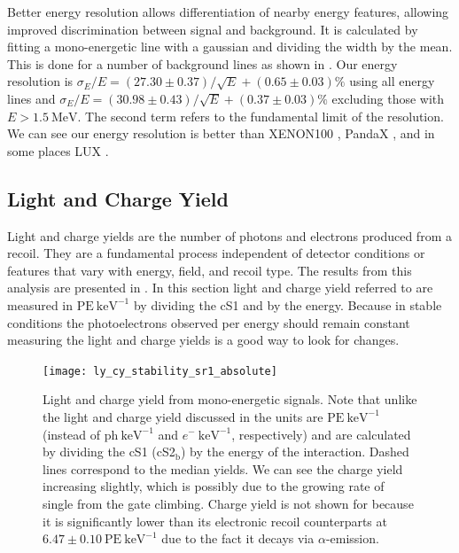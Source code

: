 Better energy resolution
allows differentiation of nearby energy features, allowing improved discrimination between signal and background.  It is calculated
by fitting a mono-energetic \gammaray line with a gaussian and dividing the width by the mean.  This is done for a number of background
lines as shown in .  Our energy resolution
is $\sigma_E / E = (27.30 \pm 0.37) / \sqrt{E} + (0.65 \pm 0.03)\%$ using all energy lines and
$\sigma_E / E = (30.98 \pm 0.43) / \sqrt{E} + (0.37 \pm 0.03)\%$ excluding those with $E > 1.5\ \mathrm{MeV}$.  The second term refers to
the fundamental limit of the resolution.  We can see our energy resolution is better than XENON100 , PandaX
, and in some places LUX .



\subsection{Light and Charge Yield}
\label{subsec:det_char_ly_cy}
Light and charge yields are the number of photons and electrons produced from a recoil.  They are a fundamental process independent of
detector conditions or features that vary with energy, field, and recoil type.  The results from this analysis are presented in
.  In this section light and charge yield referred to are measured in
$\mathrm{PE\ keV^{-1}}$ by dividing the cS1 and \cstwob by the energy.  Because in stable conditions the photoelectrons
observed per energy should remain constant measuring the light and charge yields is a good way to look for changes.

\begin{figure}
\centering
\texttt{[image: ly\_cy\_stability\_sr1\_absolute]}
\caption[Light and charge yield from mono-energetic signals.]{Light and charge yield from mono-energetic signals.  Note that unlike the light
and charge yield discussed in
 the units are $\mathrm{PE\ keV^{-1}}$ (instead of $\mathrm{ph\ keV^{-1}}$ and
$e^-\ \mathrm{keV^{-1}}$, respectively) and are calculated by dividing the cS1 (cS2$_{\mathrm{b}}$) by the energy of the
interaction.  Dashed lines correspond to the median yields.  We can see the charge yield increasing slightly, which is possibly due to
the growing rate of single \electron from the gate climbing.  Charge yield is not shown for  because it is significantly
lower than its
electronic recoil counterparts at $6.47 \pm 0.10\ \mathrm{PE\ keV^{-1}}$ due to the fact it decays via $\alpha$-emission.}
\label{fig:det_char_ly_cy_ly_cy}
\end{figure}


